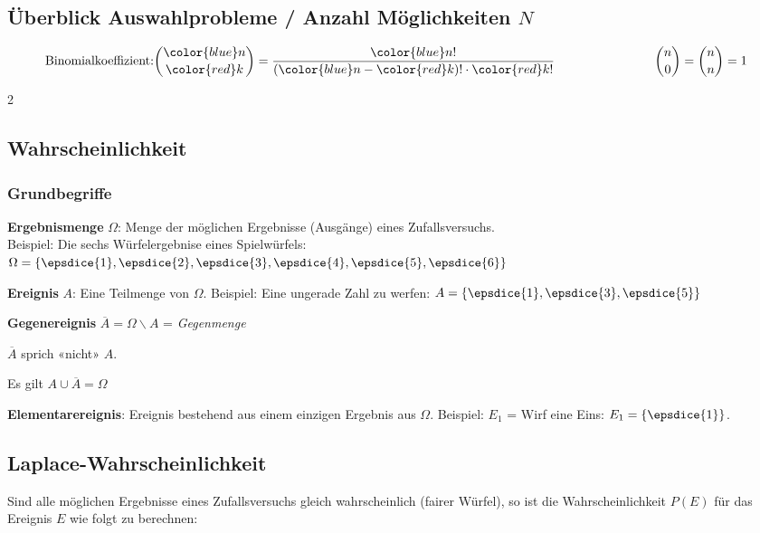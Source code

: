 \newpage
\headerUndFooterJedeSeite{}


\subsection*{Überblick Auswahlprobleme / Anzahl Möglichkeiten $N$ }

$$\textrm{Binomialkoeffizient:} {{\color{blue}n}\choose
{\color{red}k}}
=\frac{{\color{blue}n}!}{({\color{blue}n}-{\color{red}k})!\cdot
{\color{red}k}!}\phantom{etwas Platz lassen} {n\choose 0}= {n\choose
n}= 1$$

\ifisRLP
{}
\else
{}
\fi


\hrulefill



\begin{multicols}{2}


\subsection*{Wahrscheinlichkeit}
\subsubsection*{Grundbegriffe}

\textbf{Ergebnismenge} $\Omega$: Menge der möglichen Ergebnisse
(Ausgänge) eines Zufallsversuchs.\\
Beispiel: Die sechs Würfelergebnise
eines Spielwürfels: $\Omega = \left\{\epsdice{1}, \epsdice{2}, \epsdice{3}, \epsdice{4}, \epsdice{5}, \epsdice{6}\right\}$

\textbf{Ereignis} $A$: Eine Teilmenge von $\Omega$. Beispiel: Eine
ungerade Zahl zu werfen: $A  = \left\{\epsdice{1}, \epsdice{3}, \epsdice{5}\right\}$

\textbf{Gegenereignis} $\overline{A} = \Omega \backslash A$ =
\textit{Gegenmenge}

$\overline{A}$ sprich «nicht» $A$.

Es gilt $A \cup \overline{A} = \Omega$

\textbf{Elementarereignis}: Ereignis bestehend aus einem einzigen
Ergebnis aus $\Omega$. Beispiel: $E_1$ = Wirf eine Eins: $E_1
= \left\{\epsdice{1}\right\}$.



\subsection*{Laplace-Wahrscheinlichkeit}
Sind alle möglichen Ergebnisse eines Zufallsversuchs gleich
wahrscheinlich (fairer Würfel), so ist die Wahrscheinlichkeit $P(E)$ für das Ereignis
$E$ wie folgt zu berechnen:


\end{multicols}
